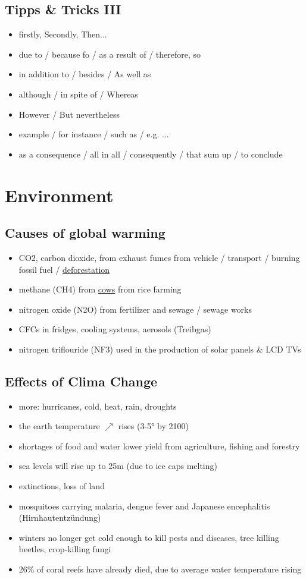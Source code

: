 \documentclass[a5paper,12pt,twoside,titlepage]{scrartcl}
\begin{document}
\subsection{Tipps \& Tricks III}
		\begin{itemize}
			\item firstly, Secondly, Then...
			\item due to / because fo / as a result of / therefore, so
			\item in addition to / besides / As well as
			\item although / in spite of / Whereas
			\item However / But nevertheless
			\item example / for instance / such as / e.g. ...
			\item as a consequence / all in all / consequently / that sum up / to conclude
		\end{itemize}
\newpage

\section{Environment}
\subsection{Causes of global warming}
		\begin{itemize}
		\item CO2, carbon dioxide, from exhaust fumes from vehicle / transport / burning fossil fuel / \underline{deforestation}
		\item methane (CH4) from \underline{cows} from rice farming
		\item nitrogen oxide (N2O) from fertilizer and sewage / sewage works
		\item CFCs in fridges, cooling systems, aerosols (Treibgas) 
		\item nitrogen triflouride (NF3) used in the production of solar panels \& LCD TVs
		\end{itemize}
\subsection{Effects of Clima Change}
			\begin{itemize}
			\item more: hurricanes, cold, heat, rain, droughts
			\item the earth temperature $\nearrow$ rises (3-5° by 2100)
			\item shortages of food and water \textrightarrow lower yield from agriculture, fishing and forestry
			\item sea levels will rise up to 25m (due to ice caps melting)
			\item extinctions, loss of land
			\item mosquitoes carrying malaria, dengue fever and Japanese encephalitis (Hirnhautentzündung)
			\item winters no longer get cold enough to kill pests and diseases, tree killing beetles, crop-killing fungi
			\item 26\% of coral reefs have already died, due to average water temperature rising
			\end{itemize}
\end{document}
